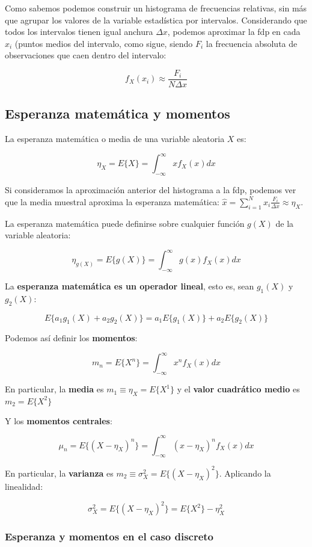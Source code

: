 \documentclass[11pt]{article}
\begin{document}
Como sabemos podemos construir un histograma de frecuencias relativas,
sin más que agrupar los valores de la variable estadística por
intervalos. Considerando que todos los intervalos tienen igual anchura
\(\Delta x\), podemos aproximar la fdp en cada \(x_i\) (puntos medios
del intervalo, como sigue, siendo \(F_i\) la frecuencia absoluta de
observaciones que caen dentro del intervalo:

\[f_X(x_i) \approx \frac{F_i}{N\Delta x}\]

    \hypertarget{esperanza-matemuxe1tica-y-momentos}{%
\subsection*{Esperanza matemática y
momentos}\label{esperanza-matemuxe1tica-y-momentos}}

La esperanza matemática o media de una variable aleatoria \(X\) es:

\[\eta_X = E\{X\}=\int_{-\infty}^{\infty}xf_X(x)dx\]

Si consideramos la aproximación anterior del histograma a la fdp,
podemos ver que la media muestral aproxima la esperanza matemática:
\(\hat x = \sum_{i=1}^Nx_i\frac{F_i}{\Delta x} \approx \eta_X\).

La esperanza matemática puede definirse sobre cualquier función \(g(X)\)
de la variable aleatoria:

\[\eta_{g(X)} = E\{g(X)\}=\int_{-\infty}^{\infty}g(x)f_X(x)dx\]

La \textbf{esperanza matemática es un operador lineal}, esto es, sean
\(g_1(X)\) y \(g_2(X)\):

\[E\{a_1g_1(X)+a_2g_2(X)\}=a_1E\{g_1(X)\}+a_2E\{g_2(X)\}\]

    Podemos así definir los \textbf{momentos}:

\[m_n=E\{X^n\}=\int_{-\infty}^{\infty}x^nf_X(x)dx\]

En particular, la \textbf{media} es \(m_1\equiv\eta_X=E\{X^1\}\) y el
\textbf{valor cuadrático medio} es \(m_2=E\{X^2\}\)

Y los \textbf{momentos centrales}:

\[\mu_n=E\{(X-\eta_X)^n\}=\int_{-\infty}^{\infty}(x-\eta_X)^nf_X(x)dx\]

En particular, la \textbf{varianza} es
\(m_2\equiv \sigma_X^2 =E\{(X-\eta_X)^2\}\). Aplicando la linealidad:

\[\sigma_X^2=E\{(X-\eta_X)^2\}=E\{X^2\}-\eta_X^2\]

    \hypertarget{esperanza-y-momentos-en-el-caso-discreto}{%
\subsubsection*{Esperanza y momentos en el caso
discreto}\label{esperanza-y-momentos-en-el-caso-discreto}}
\end{document}
